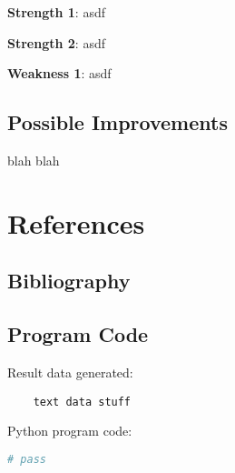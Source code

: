 \documentclass{mcm}
\numberwithin{figure}{section}
\numberwithin{table}{section}
\numberwithin{equation}{section}
\begin{document}
    \noindent\textbf{Strength 1}: asdf

    \noindent\textbf{Strength 2}: asdf

    \noindent\textbf{Weakness 1}: asdf

    \subsection{Possible Improvements}
    blah blah


    \newpage


    \section{References}

    \subsection{Bibliography}
    \printbibliography

    \subsection{Program Code}
    \noindent Result data generated:
    \begin{verbatim}
    text data stuff

    \end{verbatim}

    \noindent Python program code:
    \begin{lstlisting}[language=Python,label={lst:code}]
        # pass

    \end{lstlisting}
\end{document}

